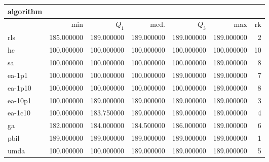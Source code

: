 \begin{tabular}{@{}l*{5}{>{{}}N{3}{0}}>{{}}N{2}{0}@{}}
\toprule
{algorithm} &  \\
\midrule
& {min} & {$Q_1$} & {med.} & {$Q_3$} & {max} & {rk}\\
\midrule
rls & 185.000000 & {\color{blue}} 189.000000 & {\color{blue}} 189.000000 & {\color{blue}} 189.000000 & {\color{blue}} 189.000000 & 2\\
hc & 100.000000 & 100.000000 & 100.000000 & 100.000000 & 100.000000 & 10\\
sa & 100.000000 & 100.000000 & 100.000000 & 100.000000 & {\color{blue}} 189.000000 & 8\\
ea-1p1 & 100.000000 & 100.000000 & 100.000000 & {\color{blue}} 189.000000 & {\color{blue}} 189.000000 & 7\\
ea-1p10 & 100.000000 & 100.000000 & 100.000000 & 100.000000 & {\color{blue}} 189.000000 & 8\\
ea-10p1 & 100.000000 & {\color{blue}} 189.000000 & {\color{blue}} 189.000000 & {\color{blue}} 189.000000 & {\color{blue}} 189.000000 & 3\\
ea-1c10 & 100.000000 & 183.750000 & {\color{blue}} 189.000000 & {\color{blue}} 189.000000 & {\color{blue}} 189.000000 & 4\\
ga & 182.000000 & 184.000000 & 184.500000 & 186.000000 & {\color{blue}} 189.000000 & 6\\
pbil & {\color{blue}} 189.000000 & {\color{blue}} 189.000000 & {\color{blue}} 189.000000 & {\color{blue}} 189.000000 & {\color{blue}} 189.000000 & 1\\
umda & 100.000000 & 100.000000 & {\color{blue}} 189.000000 & {\color{blue}} 189.000000 & {\color{blue}} 189.000000 & 5\\
\bottomrule
\end{tabular}
